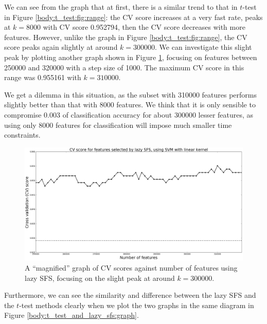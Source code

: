 \documentclass[12pt, twoside, a4paper]{report}
\begin{document}
We can see from the graph that at first, there is a similar trend to that in $t$-test in Figure \ref{body:t_test:fig:range}: the CV score increases at a very fast rate, peaks at $k=8000$ with CV score 0.952794, then the CV score decreases with more features. However, unlike the graph in Figure \ref{body:t_test:fig:range}, the CV score peaks again slightly at around $k=300000$. We can investigate this slight peak by plotting another graph shown in Figure \ref{body:lazy_sfs_smaller_range:graph}, focusing on features between 250000 and 320000 with a step size of 1000. The maximum CV score in this range was 0.955161 with $k=310000$.

We get a dilemma in this situation, as the subset with 310000 features performs slightly better than that with 8000 features. We think that it is only sensible to compromise 0.003 of classification accuracy for about 300000 lesser features, as using only 8000 features for classification will impose much smaller time constraints.

\begin{figure}
\centering
\includegraphics[width=\textwidth]{images/lazy_sfs_smaller_range.jpeg}
\caption{A ``magnified'' graph of CV scores against number of features using lazy SFS, focusing on the slight peak at around $k=300000$.}
\label{body:lazy_sfs_smaller_range:graph}
\end{figure}

Furthermore, we can see the similarity and difference between the lazy SFS and the $t$-test methods clearly when we plot the two graphs in the same diagram in Figure \ref{body:t_test_and_lazy_sfs:graph}.
\end{document}
